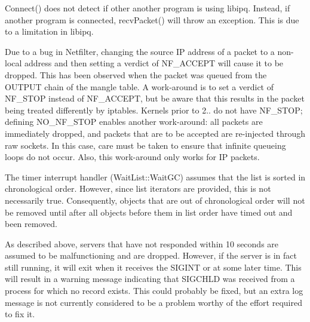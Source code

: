 
\begin{DoxyRefList}
\item[\label{bug__bug000001}%
\hypertarget{bug__bug000001}{}%
\-Class \hyperlink{classIPQ_1_1IpqSocket}{\-I\-P\-Q\-:\-:\-Ipq\-Socket} ]\-Connect() does not detect if other another program is using libipq. \-Instead, if another program is connected, recv\-Packet() will throw an exception. \-This is due to a limitation in libipq. 

\-Due to a bug in \-Netfilter, changing the source \-I\-P address of a packet to a non-\/local address and then setting a verdict of \-N\-F\-\_\-\-A\-C\-C\-E\-P\-T will cause it to be dropped. \-This has been observed when the packet was queued from the \-O\-U\-T\-P\-U\-T chain of the mangle table. \-A work-\/around is to set a verdict of \-N\-F\-\_\-\-S\-T\-O\-P instead of \-N\-F\-\_\-\-A\-C\-C\-E\-P\-T, but be aware that this results in the packet being treated differently by iptables. \-Kernels prior to 2.. do not have \-N\-F\-\_\-\-S\-T\-O\-P; defining \-N\-O\-\_\-\-N\-F\-\_\-\-S\-T\-O\-P enables another work-\/around\-: all packets are immediately dropped, and packets that are to be accepted are re-\/injected through raw sockets. \-In this case, care must be taken to ensure that infinite queueing loops do not occur. \-Also, this work-\/around only works for \-I\-P packets.  
\item[\label{bug__bug000006}%
\hypertarget{bug__bug000006}{}%
\-Class \hyperlink{classLibWheel_1_1WaitList}{\-Lib\-Wheel\-:\-:\-Wait\-List} ]\-The timer interrupt handler (\-Wait\-List\-::\-Wait\-G\-C) assumes that the list is sorted in chronological order. \-However, since list iterators are provided, this is not necessarily true. \-Consequently, objects that are out of chronological order will not be removed until after all objects before them in list order have timed out and been removed. 
\item[\label{bug__bug000002}%
\hypertarget{bug__bug000002}{}%
\-Class \hyperlink{classNERD_1_1ConnectionServer}{\-N\-E\-R\-D\-:\-:\-Connection\-Server} ]\-As described above, servers that have not responded within 10 seconds are assumed to be malfunctioning and are dropped. \-However, if the server is in fact still running, it will exit when it receives the \-S\-I\-G\-I\-N\-T or at some later time. \-This will result in a warning message indicating that \-S\-I\-G\-C\-H\-L\-D was received from a process for which no record exists. \-This could probably be fixed, but an extra log message is not currently considered to be a problem worthy of the effort required to fix it.  

\end{DoxyRefList}
